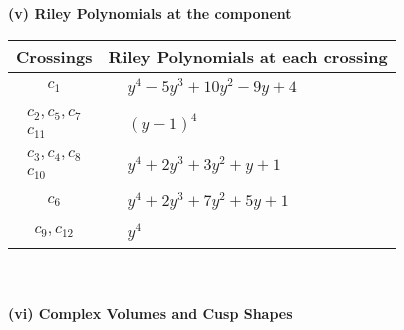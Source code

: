 \documentclass[1p]{elsarticle_modified}
\theoremstyle{definition}
\begin{document}
\newpage\renewcommand{\arraystretch}{1}
\flushleft \textbf{(v) Riley Polynomials at the component}\newline \\
\begin{tabular}{m{50pt}|m{274pt}}
Crossings & \hspace{64pt}Riley Polynomials at each crossing \\
\hline $$\begin{aligned}c_{1}\end{aligned}$$&$\begin{aligned}
&y^4-5 y^3+10 y^2-9 y+4
\end{aligned}$\\
\hline $$\begin{aligned}c_{2},c_{5},c_{7}\\c_{11}\end{aligned}$$&$\begin{aligned}
&(y-1)^4
\end{aligned}$\\
\hline $$\begin{aligned}c_{3},c_{4},c_{8}\\c_{10}\end{aligned}$$&$\begin{aligned}
&y^4+2 y^3+3 y^2+y+1
\end{aligned}$\\
\hline $$\begin{aligned}c_{6}\end{aligned}$$&$\begin{aligned}
&y^4+2 y^3+7 y^2+5 y+1
\end{aligned}$\\
\hline $$\begin{aligned}c_{9},c_{12}\end{aligned}$$&$\begin{aligned}
&y^4
\end{aligned}$\\
\hline
\end{tabular}\\~\\
\newpage\flushleft \textbf{(vi) Complex Volumes and Cusp Shapes}
\end{document}
